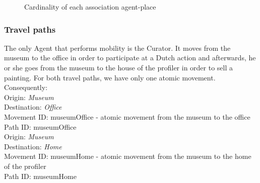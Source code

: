 \documentclass[a4paper,11pt]{report}
\begin{document}
  \begin{figure}[ht!]
   
   \caption{Cardinality of each association agent-place}
   \label{figure:mobility_cardinality}
  \end{figure}

  
  \subsubsection{Travel paths}
  The only Agent that performs mobility is the Curator. It moves from the museum
  to the office in order to participate at a Dutch action and afterwards, he or she
  goes from the museum to the house of the profiler in order to sell a painting.
  For both travel paths, we have only one atomic movement. Consequently:\\
  Origin: \textit{Museum}\\
  Destination: \textit{Office}\\
  Movement ID: museumOffice - atomic movement from the museum to the office\\
  Path ID: museumOffice\\
  
  Origin: \textit{Museum}\\
  Destination: \textit{Home}\\
  Movement ID: museumHome - atomic movement from the museum to the home of the profiler\\
  Path ID: museumHome
  
\end{document}

